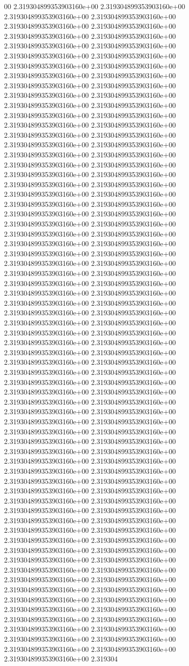 00	2.319304899353903160e+00	2.319304899353903160e+00	2.319304899353903160e+00	2.319304899353903160e+00	2.319304899353903160e+00	2.319304899353903160e+00	2.319304899353903160e+00	2.319304899353903160e+00	2.319304899353903160e+00	2.319304899353903160e+00	2.319304899353903160e+00	2.319304899353903160e+00	2.319304899353903160e+00	2.319304899353903160e+00	2.319304899353903160e+00	2.319304899353903160e+00	2.319304899353903160e+00	2.319304899353903160e+00	2.319304899353903160e+00	2.319304899353903160e+00	2.319304899353903160e+00	2.319304899353903160e+00	2.319304899353903160e+00	2.319304899353903160e+00	2.319304899353903160e+00	2.319304899353903160e+00	2.319304899353903160e+00	2.319304899353903160e+00	2.319304899353903160e+00	2.319304899353903160e+00	2.319304899353903160e+00	2.319304899353903160e+00	2.319304899353903160e+00	2.319304899353903160e+00	2.319304899353903160e+00	2.319304899353903160e+00	2.319304899353903160e+00	2.319304899353903160e+00	2.319304899353903160e+00	2.319304899353903160e+00	2.319304899353903160e+00	2.319304899353903160e+00	2.319304899353903160e+00	2.319304899353903160e+00	2.319304899353903160e+00	2.319304899353903160e+00	2.319304899353903160e+00	2.319304899353903160e+00	2.319304899353903160e+00	2.319304899353903160e+00	2.319304899353903160e+00	2.319304899353903160e+00	2.319304899353903160e+00	2.319304899353903160e+00	2.319304899353903160e+00	2.319304899353903160e+00	2.319304899353903160e+00	2.319304899353903160e+00	2.319304899353903160e+00	2.319304899353903160e+00	2.319304899353903160e+00	2.319304899353903160e+00	2.319304899353903160e+00	2.319304899353903160e+00	2.319304899353903160e+00	2.319304899353903160e+00	2.319304899353903160e+00	2.319304899353903160e+00	2.319304899353903160e+00	2.319304899353903160e+00	2.319304899353903160e+00	2.319304899353903160e+00	2.319304899353903160e+00	2.319304899353903160e+00	2.319304899353903160e+00	2.319304899353903160e+00	2.319304899353903160e+00	2.319304899353903160e+00	2.319304899353903160e+00	2.319304899353903160e+00	2.319304899353903160e+00	2.319304899353903160e+00	2.319304899353903160e+00	2.319304899353903160e+00	2.319304899353903160e+00	2.319304899353903160e+00	2.319304899353903160e+00	2.319304899353903160e+00	2.319304899353903160e+00	2.319304899353903160e+00	2.319304899353903160e+00	2.319304899353903160e+00	2.319304899353903160e+00	2.319304899353903160e+00	2.319304899353903160e+00	2.319304899353903160e+00	2.319304899353903160e+00	2.319304899353903160e+00	2.319304899353903160e+00	2.319304899353903160e+00	2.319304899353903160e+00	2.319304899353903160e+00	2.319304899353903160e+00	2.319304899353903160e+00	2.319304899353903160e+00	2.319304899353903160e+00	2.319304899353903160e+00	2.319304899353903160e+00	2.319304899353903160e+00	2.319304899353903160e+00	2.319304899353903160e+00	2.319304899353903160e+00	2.319304899353903160e+00	2.319304899353903160e+00	2.319304899353903160e+00	2.319304899353903160e+00	2.319304899353903160e+00	2.319304899353903160e+00	2.319304899353903160e+00	2.319304899353903160e+00	2.319304899353903160e+00	2.319304899353903160e+00	2.319304899353903160e+00	2.319304899353903160e+00	2.319304899353903160e+00	2.319304899353903160e+00	2.319304899353903160e+00	2.319304899353903160e+00	2.319304899353903160e+00	2.319304899353903160e+00	2.319304899353903160e+00	2.319304899353903160e+00	2.319304899353903160e+00	2.319304